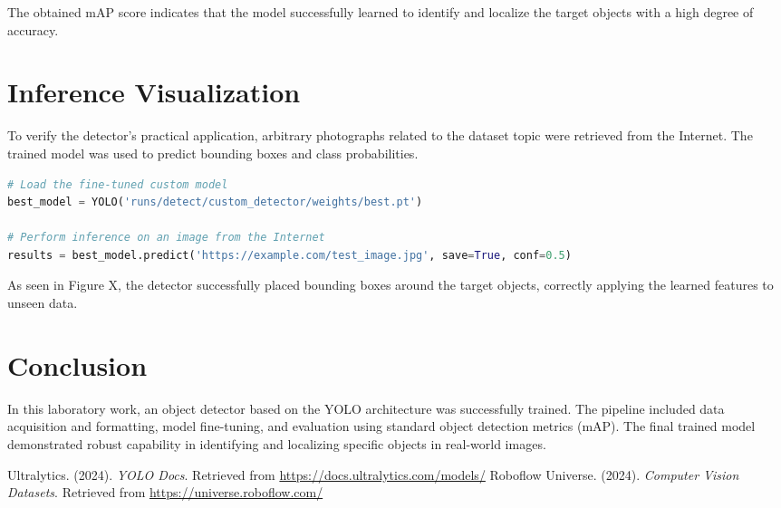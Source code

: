 \documentclass[12pt, a4paper]{article}
\begin{document}

The obtained mAP score indicates that the model successfully learned to identify and localize the target objects with a high degree of accuracy.

\section{Inference Visualization}
To verify the detector's practical application, arbitrary photographs related to the dataset topic were retrieved from the Internet. The trained model was used to predict bounding boxes and class probabilities.

\begin{lstlisting}[language=Python, caption=Model Inference]
# Load the fine-tuned custom model
best_model = YOLO('runs/detect/custom_detector/weights/best.pt')

# Perform inference on an image from the Internet
results = best_model.predict('https://example.com/test_image.jpg', save=True, conf=0.5)
\end{lstlisting}


As seen in Figure X, the detector successfully placed bounding boxes around the target objects, correctly applying the learned features to unseen data.

\section{Conclusion}
In this laboratory work, an object detector based on the YOLO architecture was successfully trained. The pipeline included data acquisition and formatting, model fine-tuning, and evaluation using standard object detection metrics (mAP). The final trained model demonstrated robust capability in identifying and localizing specific objects in real-world images.

\vspace{1cm}
\begin{thebibliography}{9}
    Ultralytics. (2024). \textit{YOLO Docs}. Retrieved from \url{https://docs.ultralytics.com/models/}
    Roboflow Universe. (2024). \textit{Computer Vision Datasets}. Retrieved from \url{https://universe.roboflow.com/}
\end{thebibliography}
\end{document}
